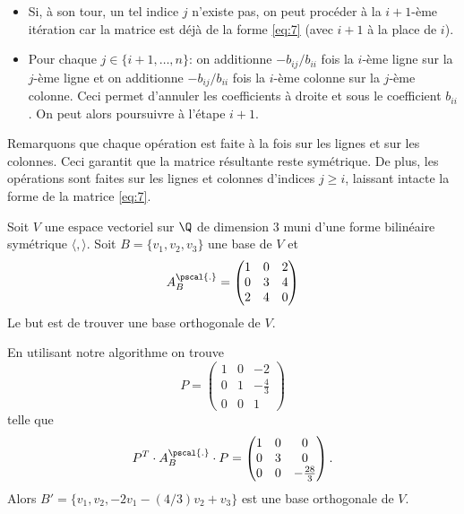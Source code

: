 \begin{algorithm}
\begin{itemize}
 \item Si, à son tour, un tel indice $j$ n'existe pas, on peut procéder à la $i+1$-ème itération car la matrice est déjà de la forme \eqref{eq:7} (avec $i+1$ à la place de $i$).
  
\item Pour chaque $j \in \{i+1,\dots,n\}$:  on additionne $-b_{ij}/b_{ii}$ fois la $i$-ème ligne sur la $j$-ème ligne et on additionne $-b_{ij}/b_{ii}$ fois la $i$-ème colonne sur la $j$-ème colonne. Ceci permet d'annuler les coefficients à droite et sous le coefficient $b_{ii}$. On peut alors poursuivre à l'étape $i+1$.
\end{itemize}    

Remarquons que chaque opération est faite à la fois sur les lignes et sur les colonnes. Ceci garantit que la matrice résultante reste symétrique. De plus, les opérations sont faites sur les lignes et colonnes d'indices $j \geq i$, laissant intacte la forme de la matrice \eqref{eq:7}.

\end{algorithm}


\begin{example}
  \label{exe:15}
  Soit $V$ une espace vectoriel sur $\Q$ de dimension $3$ muni d'une forme bilinéaire symétrique $〈,〉$. Soit $B = \{v_1,v_2,v_3\}$ une base de $V$ et 
  \begin{displaymath}
    A^{\pscal{.}}_B =
    \begin{pmatrix}
      1 & 0 & 2\\
      0 & 3 & 4\\
      2 & 4 & 0 
    \end{pmatrix}
  \end{displaymath}
Le but est de trouver une  base orthogonale de $V$. 

En utilisant notre algorithme on trouve 
\begin{displaymath}
  P = 
  \begin{pmatrix}
    
1 & 0 & -2 \\
0 & 1 & -\frac{4}{3} \\
0 & 0 & 1
  \end{pmatrix}
\end{displaymath}
telle que 
\begin{displaymath}
  P^T \cdot A^{\pscal{.}}_B \cdot P =
  \begin{pmatrix}
    1 & 0 & 0 \\
0 & 3 & 0 \\
0 & 0 & -\frac{28}{3}
  \end{pmatrix}. 
\end{displaymath}
Alors $B' = \{v_1,v_2,-2v_1 -(4/3) v_2 + v_3\}$ est une base orthogonale de $V$. 
\end{example}





